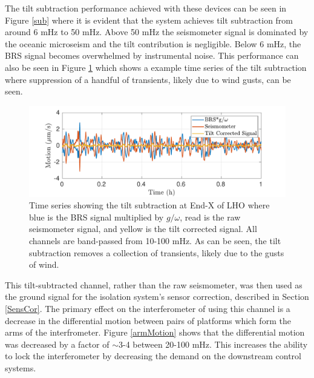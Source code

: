 \documentclass [12pt, proquest]{uwthesis}[2019]
\begin{document}
The tilt subtraction performance achieved with these devices can be seen in Figure \ref{sub} where it is evident that the system achieves tilt subtraction from around 6 mHz to 50 mHz. Above 50 mHz the seismometer signal is dominated by the oceanic microseism and the tilt contribution is negligible. Below 6 mHz, the BRS signal becomes overwhelmed by instrumental noise. This performance can also be seen in Figure \ref{subTime} which shows a example time series of the tilt subtraction where suppression of a handful of transients, likely due to wind gusts, can be seen.

\begin{figure}[!h]
\begin{center}
\includegraphics[width=\textwidth]{TiltCorrTime.pdf}
\caption[Time series showing tilt subtraction ]{Time series showing the tilt subtraction at End-X of LHO where blue is the BRS signal multiplied by $g/\omega$, read is the raw seismometer signal, and yellow is the tilt corrected signal. All channels are band-passed from 10-100 mHz. As can be seen, the tilt subtraction removes a collection of transients, likely due to the gusts of wind.}
\label{subTime}
\end{center}
\end{figure}

This tilt-subtracted channel, rather than the raw seismometer, was then used as the ground signal for the isolation system's sensor correction, described in Section \ref{SensCor}. The primary effect on the interferometer of using this channel is a decrease in the differential motion between pairs of platforms which form the arms of the interfrometer. Figure \ref{armMotion} shows that the differential motion was decreased by a factor of $\sim$3-4 between 20-100 mHz. This increases the ability to lock the interferometer by decreasing the demand on the downstream control systems.
\end{document}
